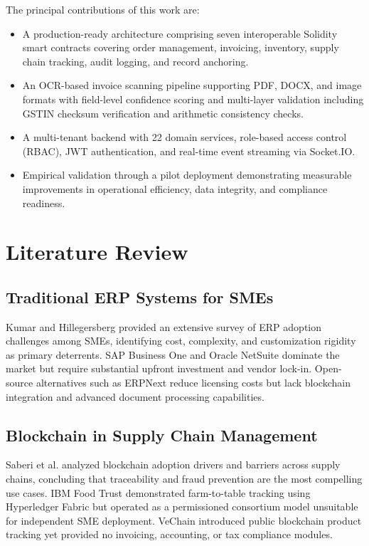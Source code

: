 \documentclass[conference]{IEEEtran}
\begin{document}
The principal contributions of this work are:
\begin{itemize}
    \item A production-ready architecture comprising seven interoperable Solidity smart contracts covering order management, invoicing, inventory, supply chain tracking, audit logging, and record anchoring.
    \item An OCR-based invoice scanning pipeline supporting PDF, DOCX, and image formats with field-level confidence scoring and multi-layer validation including GSTIN checksum verification and arithmetic consistency checks.
    \item A multi-tenant backend with 22 domain services, role-based access control (RBAC), JWT authentication, and real-time event streaming via Socket.IO.
    \item Empirical validation through a pilot deployment demonstrating measurable improvements in operational efficiency, data integrity, and compliance readiness.
\end{itemize}

\section{Literature Review}

\subsection{Traditional ERP Systems for SMEs}
Kumar and Hillegersberg \cite{b5} provided an extensive survey of ERP adoption challenges among SMEs, identifying cost, complexity, and customization rigidity as primary deterrents. SAP Business One and Oracle NetSuite dominate the market but require substantial upfront investment and vendor lock-in. Open-source alternatives such as ERPNext \cite{b6} reduce licensing costs but lack blockchain integration and advanced document processing capabilities.

\subsection{Blockchain in Supply Chain Management}
Saberi et al. \cite{b7} analyzed blockchain adoption drivers and barriers across supply chains, concluding that traceability and fraud prevention are the most compelling use cases. IBM Food Trust \cite{b8} demonstrated farm-to-table tracking using Hyperledger Fabric but operated as a permissioned consortium model unsuitable for independent SME deployment. VeChain \cite{b9} introduced public blockchain product tracking yet provided no invoicing, accounting, or tax compliance modules.
\end{document}
